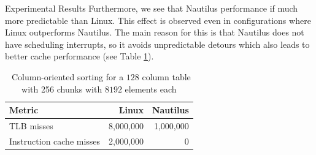 \begin{block}{Experimental Results}
  Furthermore, we see that Nautilus performance if much more predictable than Linux. This effect is observed even in configurations where Linux outperforms Nautilus. The main reason for this is that Nautilus does not have scheduling interrupts, so it avoids unpredictable detours which also leads to better cache performance (see Table \ref{table:cache_miss-col}).

    \begin{table}
      \bgroup
      \def\arraystretch{1.3}%
      \setlength\tabcolsep{1cm}
      \begin{tabular}{l || r | r }
        \textbf{Metric}  & \textbf{Linux} & \textbf{Nautilus} \\
        \hline\hline
        TLB misses               & 8,000,000 & 1,000,000 \\
        Instruction cache misses & 2,000,000 & 0  \\

      \end{tabular}
\egroup
      \caption{~Column-oriented sorting for a $128$ column table with 256 chunks with $8192$ elements each}
      \label{table:cache_miss-col}
    \end{table}
  

\end{block}

